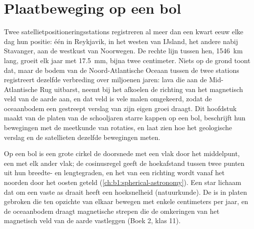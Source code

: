\chapter{Plaatbeweging op een bol}\label{ch:b1:plate-kinematics}

Twee satellietpositioneringsstations registreren al meer dan een kwart eeuw elke dag hun positie: één in Reykjavik, in het westen van IJsland, het andere nabij Stavanger, aan de westkust van Noorwegen. De rechte lijn tussen hen, \qty{1546}{km} lang, groeit elk jaar met \qty{17.5}{mm}, bijna twee centimeter. Niets op de grond toont dat, maar de bodem van de Noord-Atlantische Oceaan tussen de twee stations registreert dezelfde verbreding over miljoenen jaren: lava die aan de Mid-Atlantische Rug uitbarst, neemt bij het afkoelen de richting van het magnetisch veld van de aarde aan, en dat veld is vele malen omgekeerd, zodat de oceaanbodem een gestreept verslag van zijn eigen groei draagt. Dit hoofdstuk maakt van de platen van de schooljaren starre kappen op een bol, beschrijft hun bewegingen met de meetkunde van rotaties, en laat zien hoe het geologische verslag en de satellieten dezelfde bewegingen meten.

\begin{recall}
Op een bol is een grote cirkel de doorsnede met een vlak door het middelpunt, een  met elk ander vlak; de cosinusregel geeft de hoekafstand tussen twee punten uit hun breedte- en lengtegraden, en het  van een richting wordt vanaf het noorden door het oosten geteld (\cref{ch:b1:spherical-astronomy}). Een star lichaam dat om een vaste as draait heeft een hoeksnelheid (natuurkunde). De  is in platen gebroken die ten opzichte van elkaar bewegen met enkele centimeters per jaar, en de oceaanbodem draagt magnetische strepen die de omkeringen van het magnetisch veld van de aarde vastleggen (Boek 2, klas 11).
\end{recall}


